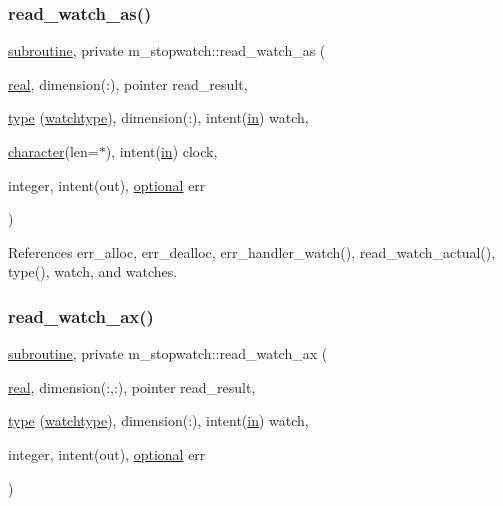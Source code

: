 \subsubsection{\texorpdfstring{read\+\_\+watch\+\_\+as()}{read\_watch\_as()}}
{\footnotesize\ttfamily \hyperlink{M__stopwatch_83_8txt_acfbcff50169d691ff02d4a123ed70482}{subroutine}, private m\+\_\+stopwatch\+::read\+\_\+watch\+\_\+as (\begin{DoxyParamCaption}\item[{\hyperlink{read__watch_83_8txt_abdb62bde002f38ef75f810d3a905a823}{real}, dimension(\+:), pointer}]{read\+\_\+result,  }\item[{\hyperlink{stop__watch_83_8txt_a70f0ead91c32e25323c03265aa302c1c}{type} (\hyperlink{structm__stopwatch_1_1watchtype}{watchtype}), dimension(\+:), intent(\hyperlink{M__journal_83_8txt_afce72651d1eed785a2132bee863b2f38}{in})}]{watch,  }\item[{\hyperlink{option__stopwatch_83_8txt_abd4b21fbbd175834027b5224bfe97e66}{character}(len=$\ast$), intent(\hyperlink{M__journal_83_8txt_afce72651d1eed785a2132bee863b2f38}{in})}]{clock,  }\item[{integer, intent(out), \hyperlink{option__stopwatch_83_8txt_aa4ece75e7acf58a4843f70fe18c3ade5}{optional}}]{err }\end{DoxyParamCaption})\hspace{0.3cm}{\ttfamily [private]}}



References err\+\_\+alloc, err\+\_\+dealloc, err\+\_\+handler\+\_\+watch(), read\+\_\+watch\+\_\+actual(), type(), watch, and watches.

\mbox{\label{namespacem__stopwatch_a653b0acb543b4a6f4d75babffe91e8c8}} 
\subsubsection{\texorpdfstring{read\+\_\+watch\+\_\+ax()}{read\_watch\_ax()}}
{\footnotesize\ttfamily \hyperlink{M__stopwatch_83_8txt_acfbcff50169d691ff02d4a123ed70482}{subroutine}, private m\+\_\+stopwatch\+::read\+\_\+watch\+\_\+ax (\begin{DoxyParamCaption}\item[{\hyperlink{read__watch_83_8txt_abdb62bde002f38ef75f810d3a905a823}{real}, dimension(\+:,\+:), pointer}]{read\+\_\+result,  }\item[{\hyperlink{stop__watch_83_8txt_a70f0ead91c32e25323c03265aa302c1c}{type} (\hyperlink{structm__stopwatch_1_1watchtype}{watchtype}), dimension(\+:), intent(\hyperlink{M__journal_83_8txt_afce72651d1eed785a2132bee863b2f38}{in})}]{watch,  }\item[{integer, intent(out), \hyperlink{option__stopwatch_83_8txt_aa4ece75e7acf58a4843f70fe18c3ade5}{optional}}]{err }\end{DoxyParamCaption})\hspace{0.3cm}{\ttfamily [private]}}



